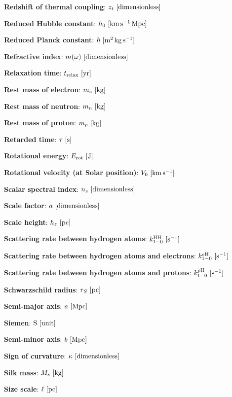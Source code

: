 \documentclass[a4paper,10pt]{article}
\begin{document}
{\noindent}\textbf{Redshift of thermal coupling}: $z_t ~ [{\rm dimensionless}]$

{\noindent}\textbf{Reduced Hubble constant}: $h_0 ~ [{\rm km\,s^{-1}\,Mpc}]$

{\noindent}\textbf{Reduced Planck constant}: $\hbar ~ [{\rm m^2\,kg\,s^{-1}}]$

{\noindent}\textbf{Refractive index}: $m(\omega) ~ [{\rm dimensionless}]$

{\noindent}\textbf{Relaxation time}: $t_\mathrm{relax} ~ [{\rm yr}]$

{\noindent}\textbf{Rest mass of electron}: $m_e ~ [{\rm kg}]$

{\noindent}\textbf{Rest mass of neutron}: $m_n ~ [{\rm kg}]$

{\noindent}\textbf{Rest mass of proton}: $m_p ~ [{\rm kg}]$

{\noindent}\textbf{Retarded time}: $\tau ~ [{\rm s}]$

{\noindent}\textbf{Rotational energy}: $E_{\rm rot} ~ [{\rm J}]$

{\noindent}\textbf{Rotational velocity (at Solar position)}: $V_0 ~ [{\rm km\,s^{-1}}]$

{\noindent}\textbf{Scalar spectral index}: $n_s ~ [{\rm dimensionless}]$

{\noindent}\textbf{Scale factor}: $a ~ [{\rm dimensionless}]$

{\noindent}\textbf{Scale height}: $h_z ~ [{\rm pc}]$

{\noindent}\textbf{Scattering rate between hydrogen atoms}: $k_{1-0}^\mathrm{HH} ~ [{\rm s^{-1}}]$

{\noindent}\textbf{Scattering rate between hydrogen atoms and electrons}: $k_{1-0}^{e\mathrm{H}} ~ [{\rm s^{-1}}]$

{\noindent}\textbf{Scattering rate between hydrogen atoms and protons}: $k_{1-0}^{p\mathrm{H}} ~ [{\rm s^{-1}}]$

{\noindent}\textbf{Schwarzschild radius}: $r_S ~ [{\rm pc}]$

{\noindent}\textbf{Semi-major axis}: $a ~ [{\rm Mpc}]$

{\noindent}\textbf{Siemen}: ${\rm S} ~ [{\rm unit}]$

{\noindent}\textbf{Semi-minor axis}: $b ~ [{\rm Mpc}]$

{\noindent}\textbf{Sign of curvature}: $\kappa ~ [{\rm dimensionless}]$

{\noindent}\textbf{Silk mass}: $M_s ~ [{\rm kg}]$

{\noindent}\textbf{Size scale}: $\ell ~ [{\rm pc}]$
\end{document}
